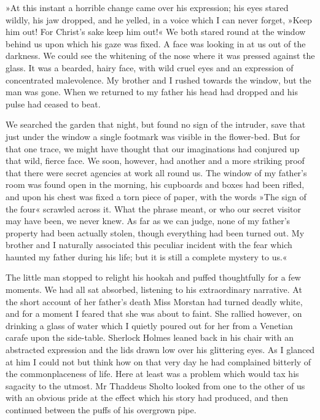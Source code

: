 »At this instant a horrible change came over his expression; his eyes stared wildly, his jaw dropped, and he yelled, in a voice which I can never forget, »Keep him out! For Christ's sake keep him out!« We both stared round at the window behind us upon which his gaze was fixed. A face was looking in at us out of the darkness. We could see the whitening of the nose where it was pressed against the glass. It was a bearded, hairy face, with wild cruel eyes and an expression of concentrated malevolence. My brother and I rushed towards the window, but the man was gone. When we returned to my father his head had dropped and his pulse had ceased to beat.

We searched the garden that night, but found no sign of the intruder, save that just under the window a single footmark was visible in the flower-bed. But for that one trace, we might have thought that our imaginations had conjured up that wild, fierce face. We soon, however, had another and a more striking proof that there were secret agencies at work all round us. The window of my father's room was found open in the morning, his cupboards and boxes had been rifled, and upon his chest was fixed a torn piece of paper, with the words »The sign of the four« scrawled across it. What the phrase meant, or who our secret visitor may have been, we never knew. As far as we can judge, none of my father's property had been actually stolen, though everything had been turned out. My brother and I naturally associated this peculiar incident with the fear which haunted my father during his life; but it is still a complete mystery to us.«

The little man stopped to relight his hookah and puffed thoughtfully for a few moments. We had all sat absorbed, listening to his extraordinary narrative. At the short account of her father's death Miss Morstan had turned deadly white, and for a moment I feared that she was about to faint. She rallied however, on drinking a glass of water which I quietly poured out for her from a Venetian carafe upon the side-table. Sherlock Holmes leaned back in his chair with an abstracted expression and the lids drawn low over his glittering eyes. As I glanced at him I could not but think how on that very day he had complained bitterly of the commonplaceness of life. Here at least was a problem which would tax his sagacity to the utmost. Mr Thaddeus Sholto looked from one to the other of us with an obvious pride at the effect which his story had produced, and then continued between the puffs of his overgrown pipe.

